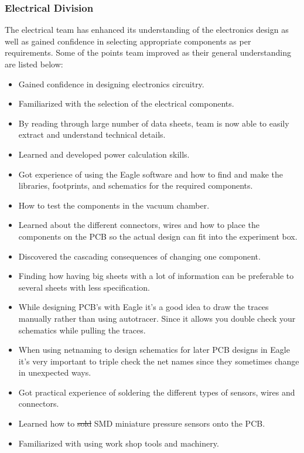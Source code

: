 \documentclass[a4paper,12pt,oneside]{article}
\providecommand{\DIFaddtex}[1]{{\protect\color{blue}\uwave{#1}}} %
\providecommand{\DIFdeltex}[1]{{\protect\color{red}\sout{#1}}}                      %
\providecommand{\DIFaddbegin}{} %
\providecommand{\DIFaddend}{} %
\providecommand{\DIFdelbegin}{} %
\providecommand{\DIFdelend}{} %
\providecommand{\DIFadd}[1]{\texorpdfstring{\DIFaddtex{#1}}{#1}} %
\providecommand{\DIFdel}[1]{\texorpdfstring{\DIFdeltex{#1}}{}} %
\newcommand{\DIFscaledelfig}{0.5}
\newlength{\DIFdelgraphicswidth} %
\newlength{\DIFdelgraphicsheight} %
\newcommand{\DIFaddincludegraphics}[2][]{{\color{blue}\fbox{\DIFOincludegraphics[#1]{#2}}}} %
\newcommand{\DIFdelincludegraphics}[2][]{%
\sbox{\DIFdelgraphicsbox}{\DIFOincludegraphics[#1]{#2}}%
\settoboxwidth{\DIFdelgraphicswidth}{\DIFdelgraphicsbox} %
\settoboxtotalheight{\DIFdelgraphicsheight}{\DIFdelgraphicsbox} %
\scalebox{\DIFscaledelfig}{%
\parbox[b]{\DIFdelgraphicswidth}{\usebox{\DIFdelgraphicsbox}\\[-\baselineskip] \rule{\DIFdelgraphicswidth}{0em}}\llap{\resizebox{\DIFdelgraphicswidth}{\DIFdelgraphicsheight}{%
\setlength{\unitlength}{\DIFdelgraphicswidth}%
\begin{picture}(1,1)%
\thicklines\linethickness{2pt} %
{\color[rgb]{1,0,0}\put(0,0){\framebox(1,1){}}}%
{\color[rgb]{1,0,0}\put(0,0){\line( 1,1){1}}}%
{\color[rgb]{1,0,0}\put(0,1){\line(1,-1){1}}}%
\end{picture}%
}\hspace*{3pt}}} %
} %
\DeclareRobustCommand{\DIFaddbegin}{\DIFOaddbegin \let\includegraphics\DIFaddincludegraphics} %
\DeclareRobustCommand{\DIFaddend}{\DIFOaddend \let\includegraphics\DIFOincludegraphics} %
\DeclareRobustCommand{\DIFdelbegin}{\DIFOdelbegin \let\includegraphics\DIFdelincludegraphics} %
\DeclareRobustCommand{\DIFdelend}{\DIFOaddend \let\includegraphics\DIFOincludegraphics} %
\begin{document}
\subsubsection{Electrical Division}
The electrical team has enhanced its understanding of the electronics design as well as gained confidence in selecting appropriate components as per requirements. Some of the points team improved as their general understanding are listed below:  
\begin{itemize}

    \item Gained confidence in designing electronics circuitry.
    \item Familiarized with the selection of the electrical components. 
    \item By reading through large number of data sheets, team is now able to easily extract and understand technical details. 
    \item Learned and developed power calculation skills.
    \item Got experience of using the Eagle software and how to find and make the libraries, footprints, and schematics for the required components.
    \item How to test the components in the vacuum chamber.
    \item Learned about the different connectors, wires and how to place the components on the PCB so the actual design can fit into the experiment box.
    \item Discovered the cascading consequences of changing one component.
    \item Finding how having big sheets with a lot of information can be preferable to several sheets with less specification.
    \item While designing PCB's with Eagle it's a good idea to draw the traces manually rather than using autotracer. Since it allows you double check your schematics while pulling the traces.
    \item When using netnaming to design schematics for later PCB designs in Eagle it's very important to triple check the net names since they sometimes change in unexpected ways.
    \item Got practical experience of soldering the different types of sensors, wires and connectors. 
    \item Learned how to \DIFdelbegin \DIFdel{sold }\DIFdelend \DIFaddbegin \DIFadd{solder }\DIFaddend SMD miniature pressure sensors onto the PCB.
    \item Familiarized with using work shop tools and machinery.

\end{itemize}
\end{document}
